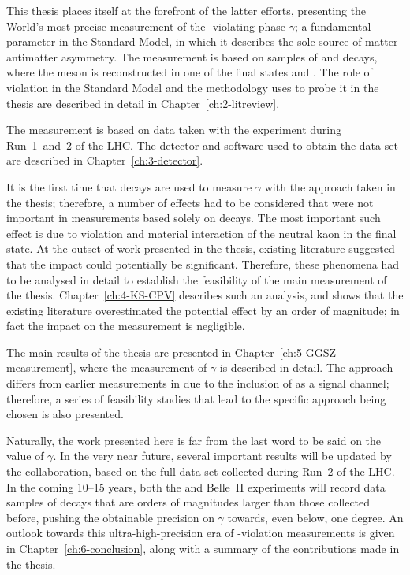 This thesis places itself at the forefront of the latter efforts, presenting the World's most precise measurement of the \CP-violating phase $\gamma$; a fundamental parameter in the Standard Model, in which it describes the sole source of matter-antimatter asymmetry. The measurement is based on samples of \BtoDK and \BtoDpi decays, where the \D meson is reconstructed in one of the final states \Kspipi and \KsKK. The role of \CP violation in the Standard Model and the methodology uses to probe it in the thesis are described in detail in Chapter~\ref{ch:2-litreview}.

The measurement is based on data taken with the \lhcb experiment during Run~1~and~2 of the LHC. The detector and software used to obtain the data set are described in Chapter~\ref{ch:3-detector}.

It is the first time that \BtoDpi decays are used to measure $\gamma$ with the approach taken in the thesis; therefore, a number of effects had to be considered that were not important in measurements based solely on \BtoDK decays. The most important such effect is due to \CP violation and material interaction of the neutral kaon in the final state. At the outset of work presented in the thesis, existing literature suggested that the impact could potentially be significant. Therefore, these phenomena had to be analysed in detail to establish the feasibility of the main measurement of the thesis. Chapter~\ref{ch:4-KS-CPV} describes such an analysis, and shows that the existing literature overestimated the potential effect by an order of magnitude; in fact the impact on the measurement is negligible.

The main results of the thesis are presented in Chapter~\ref{ch:5-GGSZ-measurement}, where the measurement of $\gamma$ is described in detail. The approach differs from earlier measurements in \lhcb due to the inclusion of \BtoDpi as a signal channel; therefore, a series of feasibility studies that lead to the specific approach being chosen is also presented.


Naturally, the work presented here is far from the last word to be said on the value of $\gamma$. In the very near future, several important results will be updated by the \lhcb collaboration, based on the full data set collected during Run~2 of the LHC. In the coming 10--15 years, both the \lhcb and Belle~II experiments will record data samples of \B decays that are orders of magnitudes larger than those collected before, pushing the obtainable precision on $\gamma$ towards, even below, one degree. An outlook towards this ultra-high-precision era of \CP-violation measurements is given in Chapter~\ref{ch:6-conclusion}, along with a summary of the contributions made in the thesis.




